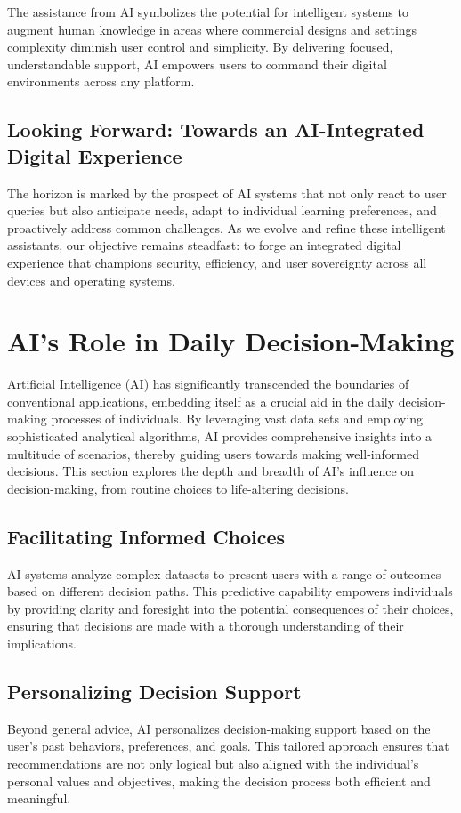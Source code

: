\documentclass[12pt]{article}
\begin{document}
The assistance from AI symbolizes the potential for intelligent systems to augment human knowledge in areas where commercial designs and settings complexity diminish user control and simplicity. By delivering focused, understandable support, AI empowers users to command their digital environments across any platform.

\subsection{Looking Forward: Towards an AI-Integrated Digital Experience}

The horizon is marked by the prospect of AI systems that not only react to user queries but also anticipate needs, adapt to individual learning preferences, and proactively address common challenges. As we evolve and refine these intelligent assistants, our objective remains steadfast: to forge an integrated digital experience that champions security, efficiency, and user sovereignty across all devices and operating systems.

\section{AI's Role in Daily Decision-Making}
Artificial Intelligence (AI) has significantly transcended the boundaries of conventional applications, embedding itself as a crucial aid in the daily decision-making processes of individuals. By leveraging vast data sets and employing sophisticated analytical algorithms, AI provides comprehensive insights into a multitude of scenarios, thereby guiding users towards making well-informed decisions. This section explores the depth and breadth of AI's influence on decision-making, from routine choices to life-altering decisions.

\subsection*{Facilitating Informed Choices}
AI systems analyze complex datasets to present users with a range of outcomes based on different decision paths. This predictive capability empowers individuals by providing clarity and foresight into the potential consequences of their choices, ensuring that decisions are made with a thorough understanding of their implications.

\subsection*{Personalizing Decision Support}
Beyond general advice, AI personalizes decision-making support based on the user's past behaviors, preferences, and goals. This tailored approach ensures that recommendations are not only logical but also aligned with the individual's personal values and objectives, making the decision process both efficient and meaningful.
\end{document}
